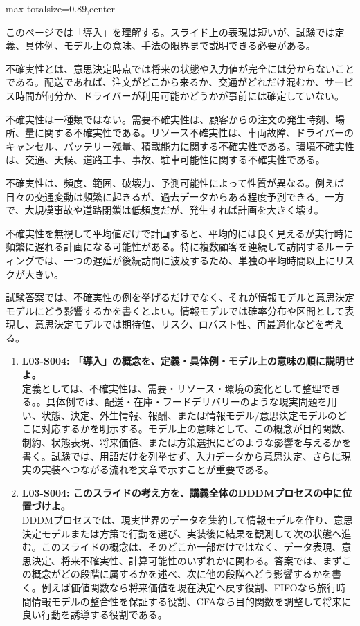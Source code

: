 \begin{minipage}[t]{0.58\textwidth}
\begin{adjustbox}{max totalsize={\textwidth}{0.89\textheight},center}
\begin{minipage}{\textwidth}\scriptsize
{}このページでは「導入」を理解する。スライド上の表現は短いが、試験では定義、具体例、モデル上の意味、手法の限界まで説明できる必要がある。\par
不確実性とは、意思決定時点では将来の状態や入力値が完全には分からないことである。配送であれば、注文がどこから来るか、交通がどれだけ混むか、サービス時間が何分か、ドライバーが利用可能かどうかが事前には確定していない。\par
不確実性は一種類ではない。需要不確実性は、顧客からの注文の発生時刻、場所、量に関する不確実性である。リソース不確実性は、車両故障、ドライバーのキャンセル、バッテリー残量、積載能力に関する不確実性である。環境不確実性は、交通、天候、道路工事、事故、駐車可能性に関する不確実性である。\par
不確実性は、頻度、範囲、破壊力、予測可能性によって性質が異なる。例えば日々の交通変動は頻繁に起きるが、過去データからある程度予測できる。一方で、大規模事故や道路閉鎖は低頻度だが、発生すれば計画を大きく壊す。\par
不確実性を無視して平均値だけで計画すると、平均的には良く見えるが実行時に頻繁に遅れる計画になる可能性がある。特に複数顧客を連続して訪問するルーティングでは、一つの遅延が後続訪問に波及するため、単独の平均時間以上にリスクが大きい。\par
試験答案では、不確実性の例を挙げるだけでなく、それが情報モデルと意思決定モデルにどう影響するかを書くとよい。情報モデルでは確率分布や区間として表現し、意思決定モデルでは期待値、リスク、ロバスト性、再最適化などを考える。\par{}\begin{enumerate}\item \textbf{L03-S004: 「導入」の概念を、定義・具体例・モデル上の意味の順に説明せよ。}\\定義としては、不確実性は、需要・リソース・環境の変化として整理できる。。具体例では、配送・在庫・フードデリバリーのような現実問題を用い、状態、決定、外生情報、報酬、または情報モデル/意思決定モデルのどこに対応するかを明示する。モデル上の意味として、この概念が目的関数、制約、状態表現、将来価値、または方策選択にどのような影響を与えるかを書く。試験では、用語だけを列挙せず、入力データから意思決定、さらに現実の実装へつながる流れを文章で示すことが重要である。\item \textbf{L03-S004: このスライドの考え方を、講義全体のDDDMプロセスの中に位置づけよ。}\\DDDMプロセスでは、現実世界のデータを集約して情報モデルを作り、意思決定モデルまたは方策で行動を選び、実装後に結果を観測して次の状態へ進む。このスライドの概念は、そのどこか一部だけではなく、データ表現、意思決定、将来不確実性、計算可能性のいずれかに関わる。答案では、まずこの概念がどの段階に属するかを述べ、次に他の段階へどう影響するかを書く。例えば価値関数なら将来価値を現在決定へ戻す役割、FIFOなら旅行時間情報モデルの整合性を保証する役割、CFAなら目的関数を調整して将来に良い行動を誘導する役割である。\end{enumerate}

\end{minipage}
\end{adjustbox}
\end{minipage}
